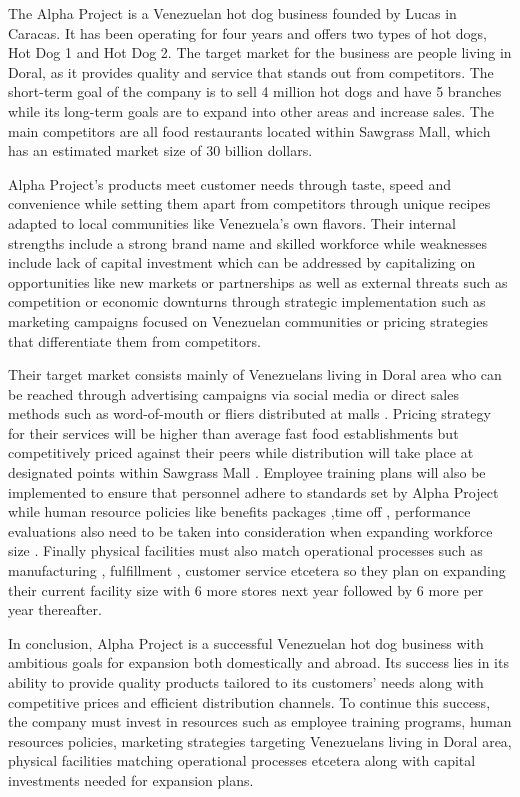 

The Alpha Project is a Venezuelan hot dog business founded by Lucas in Caracas. It has been operating for four years and offers two types of hot dogs, Hot Dog 1 and Hot Dog 2. The target market for the business are people living in Doral, as it provides quality and service that stands out from competitors. The short-term goal of the company is to sell 4 million hot dogs and have 5 branches while its long-term goals are to expand into other areas and increase sales. The main competitors are all food restaurants located within Sawgrass Mall, which has an estimated market size of 30 billion dollars. 

Alpha Project's products meet customer needs through taste, speed and convenience while setting them apart from competitors through unique recipes adapted to local communities like Venezuela's own flavors. Their internal strengths include a strong brand name and skilled workforce while weaknesses include lack of capital investment which can be addressed by capitalizing on opportunities like new markets or partnerships as well as external threats such as competition or economic downturns through strategic implementation such as marketing campaigns focused on Venezuelan communities or pricing strategies that differentiate them from competitors. 

Their target market consists mainly of Venezuelans living in Doral area who can be reached through advertising campaigns via social media or direct sales methods such as word-of-mouth or fliers distributed at malls . Pricing strategy for their services will be higher than average fast food establishments but competitively priced against their peers while distribution will take place at designated points within Sawgrass Mall . Employee training plans will also be implemented to ensure that personnel adhere to standards set by Alpha Project while human resource policies like benefits packages ,time off , performance evaluations also need to be taken into consideration when expanding workforce size . Finally physical facilities must also match operational processes such as manufacturing , fulfillment , customer service etcetera so they plan on expanding their current facility size with 6 more stores next year followed by 6 more per year thereafter. 

In conclusion, Alpha Project is a successful Venezuelan hot dog business with ambitious goals for expansion both domestically and abroad. Its success lies in its ability to provide quality products tailored to its customers' needs along with competitive prices and efficient distribution channels. To continue this success, the company must invest in resources such as employee training programs, human resources policies, marketing strategies targeting Venezuelans living in Doral area, physical facilities matching operational processes etcetera along with capital investments needed for expansion plans.